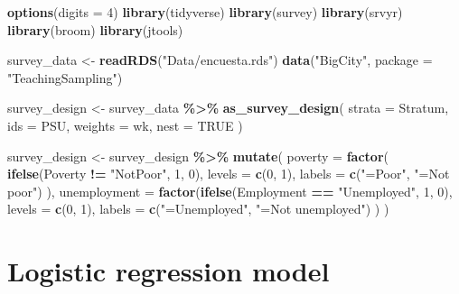 \documentclass[
  english,
  12pt,
]{book}
\newenvironment{Shaded}{\begin{snugshade}}{\end{snugshade}}
\newcommand{\AttributeTok}[1]{\textcolor[rgb]{0.13,0.29,0.53}{#1}}
\newcommand{\ConstantTok}[1]{\textcolor[rgb]{0.56,0.35,0.01}{#1}}
\newcommand{\DecValTok}[1]{\textcolor[rgb]{0.00,0.00,0.81}{#1}}
\newcommand{\FunctionTok}[1]{\textcolor[rgb]{0.13,0.29,0.53}{\textbf{#1}}}
\newcommand{\NormalTok}[1]{#1}
\newcommand{\OtherTok}[1]{\textcolor[rgb]{0.56,0.35,0.01}{#1}}
\newcommand{\SpecialCharTok}[1]{\textcolor[rgb]{0.81,0.36,0.00}{\textbf{#1}}}
\newcommand{\StringTok}[1]{\textcolor[rgb]{0.31,0.60,0.02}{#1}}
\begin{document}
\begin{Shaded}
\begin{Highlighting}[]
\FunctionTok{options}\NormalTok{(}\AttributeTok{digits =} \DecValTok{4}\NormalTok{)}
\FunctionTok{library}\NormalTok{(tidyverse)}
\FunctionTok{library}\NormalTok{(survey)}
\FunctionTok{library}\NormalTok{(srvyr)}
\FunctionTok{library}\NormalTok{(broom)}
\FunctionTok{library}\NormalTok{(jtools)}

\NormalTok{survey\_data }\OtherTok{\textless{}{-}} \FunctionTok{readRDS}\NormalTok{(}\StringTok{"Data/encuesta.rds"}\NormalTok{)}
\FunctionTok{data}\NormalTok{(}\StringTok{"BigCity"}\NormalTok{, }\AttributeTok{package =} \StringTok{"TeachingSampling"}\NormalTok{)}

\NormalTok{survey\_design }\OtherTok{\textless{}{-}}\NormalTok{ survey\_data }\SpecialCharTok{\%\textgreater{}\%}
  \FunctionTok{as\_survey\_design}\NormalTok{(}
    \AttributeTok{strata =}\NormalTok{ Stratum,}
    \AttributeTok{ids =}\NormalTok{ PSU,}
    \AttributeTok{weights =}\NormalTok{ wk,}
    \AttributeTok{nest =} \ConstantTok{TRUE}
\NormalTok{  )}

\NormalTok{survey\_design }\OtherTok{\textless{}{-}}\NormalTok{ survey\_design }\SpecialCharTok{\%\textgreater{}\%}
  \FunctionTok{mutate}\NormalTok{(}
    \AttributeTok{poverty =} \FunctionTok{factor}\NormalTok{(}
      \FunctionTok{ifelse}\NormalTok{(Poverty }\SpecialCharTok{!=} \StringTok{"NotPoor"}\NormalTok{, }\DecValTok{1}\NormalTok{, }\DecValTok{0}\NormalTok{),}
      \AttributeTok{levels =} \FunctionTok{c}\NormalTok{(}\DecValTok{0}\NormalTok{, }\DecValTok{1}\NormalTok{),}
      \AttributeTok{labels =} \FunctionTok{c}\NormalTok{(}\StringTok{"=Poor"}\NormalTok{, }\StringTok{"=Not poor"}\NormalTok{)}
\NormalTok{    ),}
    \AttributeTok{unemployment =} \FunctionTok{factor}\NormalTok{(}\FunctionTok{ifelse}\NormalTok{(Employment }\SpecialCharTok{==} \StringTok{"Unemployed"}\NormalTok{, }\DecValTok{1}\NormalTok{, }\DecValTok{0}\NormalTok{),}
      \AttributeTok{levels =} \FunctionTok{c}\NormalTok{(}\DecValTok{0}\NormalTok{, }\DecValTok{1}\NormalTok{),}
      \AttributeTok{labels =} \FunctionTok{c}\NormalTok{(}\StringTok{"=Unemployed"}\NormalTok{, }\StringTok{"=Not unemployed"}\NormalTok{)}
\NormalTok{    )}
\NormalTok{  )}
\end{Highlighting}
\end{Shaded}

\section{Logistic regression model}\label{sec-logistica}
\end{document}
